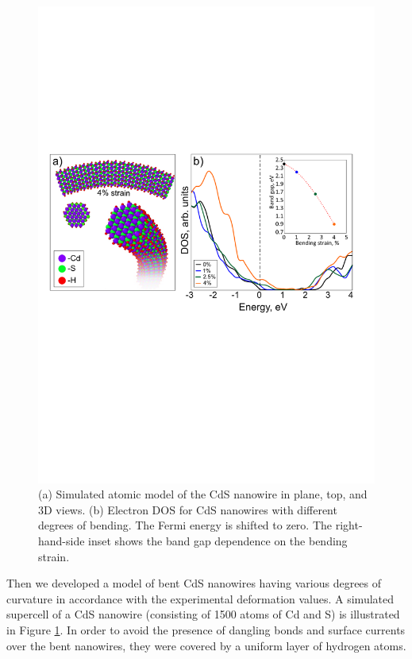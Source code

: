 \begin{figure}
\includegraphics[width=\textwidth]{figures/figure6_6}
\caption[DFTB calclulations]{(a) Simulated atomic model of the CdS nanowire in plane, top, and 3D views. (b) Electron DOS for CdS nanowires with different degrees of bending. The Fermi energy is shifted to zero. The right-hand-side inset shows the band gap dependence on the bending strain.}
\label{fig:6_6}
\end{figure}

Then we developed a model of bent CdS nanowires having various degrees of curvature in accordance with the experimental deformation values. A simulated supercell of a CdS nanowire (consisting of 1500 atoms of Cd and S) is illustrated in Figure \ref{fig:6_6}. In order to avoid the presence of dangling bonds and surface currents over the bent nanowires, they were covered by a uniform layer of hydrogen atoms. 

